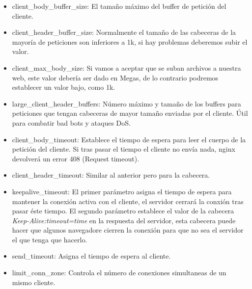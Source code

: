 \begin{itemize}
    \item client\_body\_buffer\_size: El tamaño máximo del buffer de petición
    del cliente.
    \item client\_header\_buffer\_size: Normalmente el tamaño de las cabeceras
    de la mayoría de peticiones son inferiores a 1k, si hay problemas deberemos
    subir el valor.
    \item client\_max\_body\_size: Si vamos a aceptar que se suban archivos a
    nuestra web, este valor debería ser dado en Megas, de lo contrario podremos
    establecer un valor bajo, como 1k.
    \item large\_client\_header\_buffers: Número máximo y tamaño de  los buffers
    para peticiones que tengan cabeceras de mayor tamaño enviadas por el cliente.
    Útil para combatir bad bots y ataques DoS.
    \item client\_body\_timeout: Establece el tiempo de espera para leer el cuerpo
    de la petición del cliente. Si tras pasar el tiempo el cliente no envía nada,
    nginx devolverá un error 408 (Request timeout).
    \item client\_header\_timeout: Similar al anterior pero para la cabecera.
    \item keepalive\_timeout: El primer parámetro asigna el tiempo de espera para
    mantener la conexión activa con el cliente, el servidor cerrará la conxión tras
    pasar éste tiempo. El segundo parámetro establece el valor de la cabecera \emph{Keep-Alive:timeout=time}
    en la respuesta del servidor, esta cabecera puede hacer que algunos navegadore cierren la conexión para que
    no sea el servidor el que tenga que hacerlo.
    \item send\_timeout: Asigna el tiempo de espera al cliente.
    \item limit\_conn\_zone: Controla el número de conexiones simultaneas de un mismo cliente.
\end{itemize}
